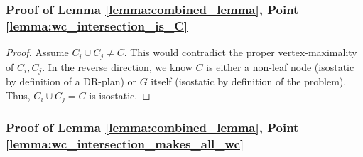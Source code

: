 







\subsubsection{Proof of Lemma \ref{lemma:combined_lemma}, Point \ref{lemma:wc_intersection_is_C}}

\begin{proof}
Assume $C_i\cup C_j \neq C$. This would contradict the proper vertex-maximality of  $C_i,C_j$.
%
In the reverse direction, we know $C$ is either a non-leaf node (isostatic by definition of a DR-plan) or $G$ itself (isostatic by definition of the problem). Thus, $C_i\cup C_j=C$ is isostatic.
\end{proof}


\subsubsection{Proof of Lemma \ref{lemma:combined_lemma}, Point \ref{lemma:wc_intersection_makes_all_wc}}

